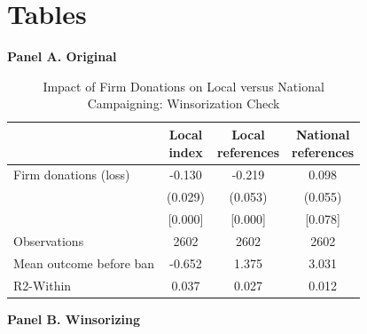 \documentclass[12pt,a4paper]{article}
\begin{document}
\clearpage


\section{Tables}

\begin{table}[!htbp]\centering
\caption{Impact of Firm Donations on Local versus National Campaigning: Winsorization Check}
\label{tab:don_local_nat_winsor}

\bigskip
\textbf{Panel A. Original}\\[1mm]

{
\def\sym#1{\ifmmode^{#1}\else\(^{#1}\)\fi}
\begin{tabular}{lccc}
\hline \hline
                & \shortstack{Local\\index}
                & \shortstack{Local\\references}
                & \shortstack{National\\references} \\
\hline
Firm donations (loss)
                &   -0.130          &   -0.219          &    0.098  \\
                &   (0.029)         &   (0.053)         &   (0.055)        \\
                &   [0.000]         &   [0.000]         &   [0.078]        \\
Observations    &     2602           &     2602           &     2602         \\
Mean outcome before ban
                &    -0.652          &     1.375          &     3.031        \\
R2-Within       &     0.037          &     0.027          &     0.012        \\
\hline \hline
\end{tabular}
}

\bigskip
\textbf{Panel B. Winsorizing}\\[1mm]


\end{table}
\end{document}
